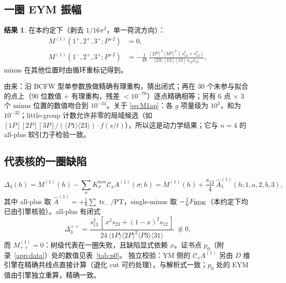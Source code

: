 \documentclass[11pt,a4paper]{ctexart}
\newcommand{\ang}[1]{\langle #1\rangle}
\newcommand{\sq}[1]{[#1]}
\newcommand{\Cx}{\mathcal C_x}
\newcommand{\tr}{\operatorname{tr}}
\newcommand{\Mone}{M^{(1)}}
\newcommand{\hA}{\widehat A}
\newcommand{\Ktree}{K^{\mathrm{tree}}}
\newcommand{\stat}[2]{\tcbox[on line,colback=#1!10,colframe=#1!70!black,boxrule=0.4pt,arc=1.5pt,
  left=2pt,right=2pt,top=0.6pt,bottom=0.6pt,boxsep=0pt,fontupper=\small\bfseries\color{#1!70!black}]{#2}}
\newcommand{\Exact}{\stat{RoyalBlue}{精确低阶检验}}
\theoremstyle{definition}
\newtheorem{result}[theorem]{结果}
\theoremstyle{remark}
\begin{document}
\subsection{一圈 EYM 振幅}
\begin{result}\label{res:M1}
在本约定下（剥去 $1/16\pi^2$，单一荷流方向）：
\begin{align}
\Mone(1^+,2^+,3^+;P^{+2})&=0, \label{eq:M1ap}\\
\Mone(1^-,2^+,3^+;P^{+2})&=-\frac1{48}\,\frac{\sq{2P}^2\sq{3P}^2\,(s_{12}^2+s_{13}^2)}{\ang{23}\,\sq{12}\sq{13}\,s_{12}s_{13}}, \label{eq:M1sm}
\end{align}
minus 在其他位置时由循环重标记得到。\hfill\Exact
\end{result}
\noindent 由来：沿 BCFW 型单参数族做精确有理重构，猜出闭式；再在 30 个未参与拟合的点上（90 位数值 + 有理重构，残差 $<10^{-70}$）逐点精确相等；另有 6 点 $\times$ 3 个 minus 位置的数值吻合到 $10^{-34}$。关于 \eqref{eq:M1ap}：各 $g$ 项量级为 $10^3$，和为 $10^{-32}$；little-group 计数允许非零的局域候选（如 $\sq{1P}\sq{2P}\sq{3P}/(\ang{P1}\ang{23})\cdot f(s/t)$），所以这是动力学结果；它与 $n=4$ 的 all-plus 软引力子检验一致。

\subsection{代表核的一圈缺陷}
\begin{equation}
\Delta_3(h)=\Mone(h)-\sum_\sigma\Ktree_\sigma\Cx A^{(1)}(\sigma;h)=\Mone(h)+\frac{s_{13}}4\,\hA^{(1)}_5(h;1,a,2,b,3),
\end{equation}
其中 all-plus 取 $\hA^{(1)}=+\tfrac16\sum\tr_-/\mathrm{PT}$，single-minus 取 $-\tfrac16F_{\rm BDK}$（本约定下均已由引擎核验）。all-plus 有闭式
\begin{equation}\label{eq:Dap}
\Delta_3^{++}=\frac{s_{13}^2\,[\,x^2s_{23}+(1-x)^2s_{12}\,]}{24\,\ang{1P}\ang{2P}^2\ang{P3}\ang{31}}\ \not\equiv 0 ,
\end{equation}
而 $\Mone_{++}=0$：树级代表在一圈失败，且缺陷显式依赖 $x$。证书点 $p_0$（附录~\ref{app:data}）处的数值见表~\ref{tab:p0}。
独立校验：YM 侧的 $\Cx A^{(1)}$ 另由 $D$ 维引擎在精确共线点直接计算（退化 cut 可约处理），与解析式一致；$p_0$ 处的 EYM 值由引擎独立重算，精确一致。

\end{document}
